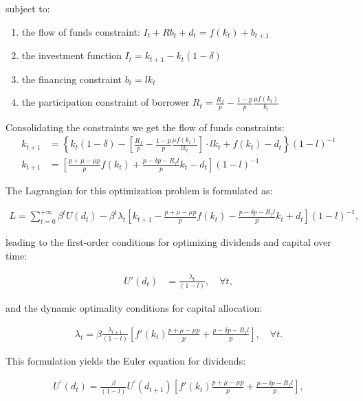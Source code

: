 \documentclass[12pt]{report}
\begin{document}
subject to:
\begin{enumerate}
    \item the flow of funds constraint: \(I_t + R b_{t} + d_t = f(k_t) + b_{t+1}\)
    \item the investment function \(I_t = k_{t+1} - k_{t}\left(1-\delta\right)\) 
    \item the financing constraint \(b_t=l k_t\)
    \item the participation constraint of borrower \(R_t=\frac{R_f}{p}  -\frac{ 1-p }{ p }\frac{\mu f(k_t)}{b_t}\)
\end{enumerate}
Consolidating the constraints we get the flow of funds constraints:
\begin{align}
    k_{t+1} &= \left\{k_{t}(1 - \delta) - \left[\frac{R_f}{p}  -\frac{ 1-p }{ p }\frac{\mu f(k_{t})}{l  k_{t}}\right] \cdot l k_{t} + f(k_{t}) - d_{t} \right \}{\left(1-l\right)}^{-1} \nonumber \\
    k_{t+1} &= \left[ \frac{p + \mu - \mu p}{p}f(k_{t}) + \frac{p - \delta p - R_f l}{p} k_{t}  - d_{t} \right](1-l)^{-1} \label{eq:ff}
\end{align}

The Lagrangian for this optimization problem is formulated as:

\begin{align}
L=\sum_{t=0}^{+\infty}\beta^t U(d_t) - \beta^t \lambda_t\left[ k_{t+1} - \frac{p + \mu - \mu p}{p}f(k_{t}) - \frac{p - \delta p - R_f l}{p} k_{t}  + d_{t} \right](1-l)^{-1},
\end{align}

leading to the first-order conditions for optimizing dividends and capital over time:


\begin{align}
    U'(d_t) &= \frac{\lambda_t}{\left(1-l\right)}, \quad \forall t,
\end{align}


and the dynamic optimality conditions for capital allocation:


\begin{align}
    \lambda_t = \beta \frac{\lambda_{t+1}}{\left(1-l\right)} \left[ f'(k_{t})\frac{p + \mu - \mu p}{p} + \frac{p - \delta p - R_f l}{p} \right], \quad \forall t.
\end{align}


This formulation yields the Euler equation for dividends:

\begin{align}
U^{\prime}(d_{t})=\frac{\beta}{\left(1-l\right)} U^{\prime}(d_{t+1})\left[ f'(k_{t})\frac{p + \mu - \mu p}{p} + \frac{p - \delta p - R_f l}{p} \right],
\end{align}
\end{document}
